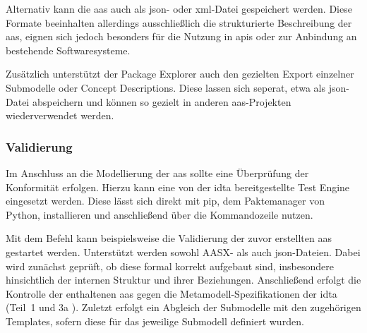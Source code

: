 Alternativ kann die \acs{aas} auch als \ac{json}- oder \ac{xml}-Datei gespeichert werden.
Diese Formate beeinhalten allerdings ausschließlich die strukturierte Beschreibung der \acs{aas}, eignen sich jedoch besonders für die Nutzung in \acsp{api} oder zur Anbindung an bestehende Softwaresysteme.

Zusätzlich unterstützt der Package Explorer auch den gezielten Export einzelner Submodelle oder Concept Descriptions.
Diese lassen sich seperat, etwa als \acs{json}-Datei abspeichern und können so gezielt in anderen \acs{aas}-Projekten wiederverwendet werden.


\subsubsection{Validierung}
Im Anschluss an die Modellierung der \acs{aas} sollte eine Überprüfung der Konformität erfolgen.
Hierzu kann eine von der \acs{idta} bereitgestellte Test Engine \cite{TestEngine} eingesetzt werden. 
Diese lässt sich direkt mit pip, dem Paktemanager von Python, installieren und anschließend über die Kommandozeile nutzen.

Mit dem Befehl 
kann beispielsweise die Validierung der zuvor erstellten \acs{aas} gestartet werden.
Unterstützt werden sowohl AASX- als auch \acs{json}-Dateien.
Dabei wird zunächst geprüft, ob diese formal korrekt aufgebaut sind, insbesondere hinsichtlich der internen Struktur und ihrer Beziehungen.
Anschließend erfolgt die Kontrolle der enthaltenen \acs{aas} gegen die Metamodell-Spezifikationen der \acs{idta} (Teil~1 \cite{SpezifikationPart1} und 3a \cite{SpezifikationPart3a}).
Zuletzt erfolgt ein Abgleich der Submodelle mit den zugehörigen Templates, sofern diese für das jeweilige Submodell definiert wurden.

